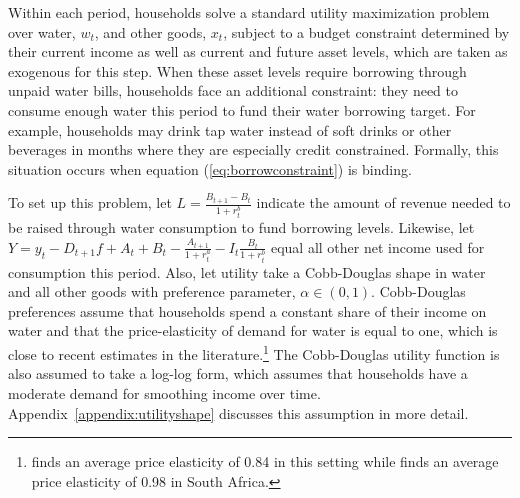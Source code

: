 \documentclass[12pt]{article}
\begin{document}
Within each period, households solve a standard utility maximization problem over water, $w_t$, and other goods, $x_t$, subject to a budget constraint determined by their current income as well as current and future asset levels, which are taken as exogenous for this step.  When these asset levels require borrowing through unpaid water bills, households face an additional constraint: they need to consume enough water this period to fund their water borrowing target.  For example, households may drink tap water instead of soft drinks or other beverages in months where they are especially credit constrained.  Formally, this situation occurs when equation (\ref{eq:borrowconstraint}) is binding.  

To set up this problem, let $L = \frac{B_{t+1} - B_t }{1+r^{b}_{t}}$ indicate the amount of revenue needed to be raised through water consumption to fund borrowing levels.  Likewise, let $Y = y_t  - D_{t+1} f   +  A_t + B_t  -  \frac{A_{t+1}}{1+r^{a}_{t}} - I_t \frac{B_t}{1+r^{b}_{t}}$ equal all other net income used for consumption this period.  Also, let utility take a Cobb-Douglas shape in water and all other goods with preference parameter, $\alpha \in (0,1)$.  Cobb-Douglas preferences assume that households spend a constant share of their income on water and that the price-elasticity of demand for water is equal to one, which is close to recent estimates in the literature.\footnote{\cite{wjv} finds an average price elasticity of 0.84 in this setting while \cite{szabo2015value} finds an average price elasticity of 0.98 in South Africa.}  The Cobb-Douglas utility function is also assumed to take a log-log form, which assumes that households have a moderate demand for smoothing income over time.  Appendix~\ref{appendix:utilityshape} discusses this assumption in more detail.
\end{document}
